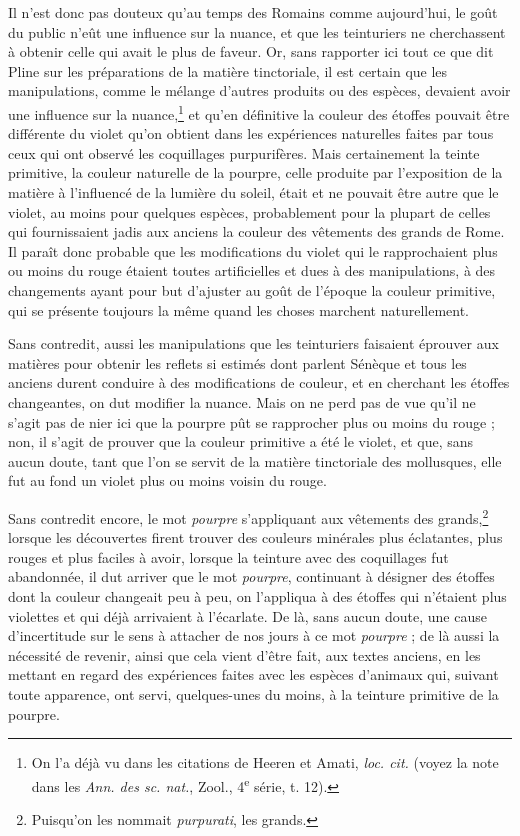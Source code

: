\documentclass[a4paper, 11pt, oneside, polutonikogreek, french]{article}
\begin{document}
Il n'est donc pas douteux qu'au temps des Romains comme aujourd'hui, le goût du public n'eût une influence sur la nuance, et que les teinturiers ne cherchassent à obtenir celle qui avait le plus de faveur. Or, sans rapporter ici tout ce que dit Pline sur les préparations de la matière tinctoriale, il est certain que les manipulations, comme le mélange d'autres produits ou des espèces, devaient avoir une influence sur la nuance,\footnote{On l'a déjà vu dans les citations de Heeren et Amati, \emph{loc. cit.} (voyez la note dans les \emph{Ann. des sc. nat.}, Zool., 4\textsuperscript{e} série, t. 12).} et qu'en définitive la couleur des étoffes pouvait être différente du violet qu'on obtient dans les expériences naturelles faites par tous ceux qui ont observé les coquillages purpurifères. Mais certainement la teinte primitive, la couleur naturelle de la pourpre, celle produite par l'exposition de la matière à l'influencé de la lumière du soleil, était et ne pouvait être autre que le violet, au moins pour quelques espèces, probablement pour la plupart de celles qui fournissaient jadis aux anciens la couleur des vêtements des grands de Rome. Il paraît donc probable que les modifications du violet qui le rapprochaient plus ou moins du rouge étaient toutes artificielles et dues à des manipulations, à des changements ayant pour but d'ajuster au goût de l'époque la couleur primitive, qui se présente toujours la même quand les choses marchent naturellement.

Sans contredit, aussi les manipulations que les teinturiers faisaient éprouver aux matières pour obtenir les reflets si estimés dont parlent Sénèque et tous les anciens durent conduire à des modifications de couleur, et en cherchant les étoffes changeantes, on dut modifier la nuance. Mais on ne perd pas de vue qu'il ne s'agit pas de nier ici que la pourpre pût se rapprocher plus ou moins du rouge ; non, il s'agit de prouver que la couleur primitive a été le violet, et que, sans aucun doute, tant que l'on se servit de la matière tinctoriale des mollusques, elle fut au fond un violet plus ou moins voisin du rouge.

Sans contredit encore, le mot \emph{pourpre} s'appliquant aux vêtements des grands,\footnote{Puisqu'on les nommait \emph{purpurati}, les grands.} lorsque les découvertes firent trouver des couleurs minérales plus éclatantes, plus rouges et plus faciles à avoir, lorsque la teinture avec des coquillages fut abandonnée, il dut arriver que le mot \emph{pourpre}, continuant à désigner des étoffes dont la couleur changeait peu à peu, on l'appliqua à des étoffes qui n'étaient plus violettes et qui déjà arrivaient à l'écarlate. De là, sans aucun doute, une cause d'incertitude sur le sens à attacher de nos jours à ce mot \emph{pourpre} ; de là aussi la nécessité de revenir, ainsi que cela vient d'être fait, aux textes anciens, en les mettant en regard des expériences faites avec les espèces d'animaux qui, suivant toute apparence, ont servi, quelques-unes du moins, à la teinture primitive de la pourpre.
\end{document}
